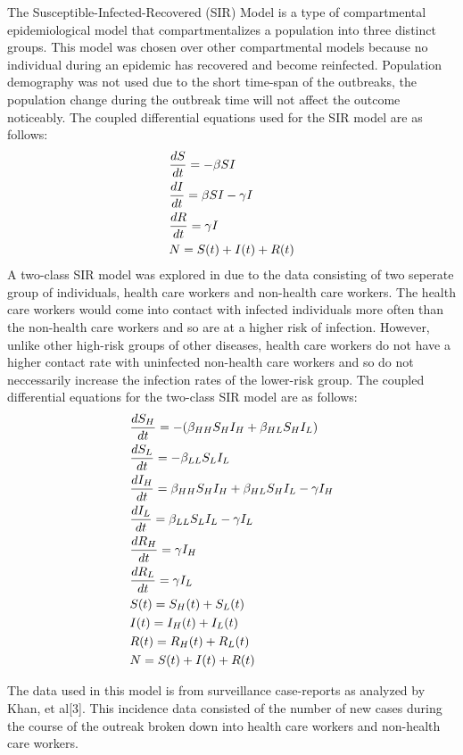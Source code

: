 \documentclass[twoside]{article}
\begin{document}
\begin{multicols}{2}
	The Susceptible-Infected-Recovered (SIR) Model is a type of compartmental epidemiological model
	that compartmentalizes a population into three distinct groups. This model was chosen over other
	compartmental models because no individual during an epidemic has recovered and become reinfected.
	Population demography was not used due to the short time-span of the outbreaks, the population
	change during the outbreak time will not affect the outcome noticeably. The coupled differential equations
	used for the SIR model are as follows:\\
		\begin{align*}
			& {dS \over dt} = -\beta S I	\\
			& {dI \over dt }= \beta S I - \gamma I	\\
			& {dR \over dt} = \gamma I\\
			& N = S(t) + I(t) +  R(t)
		\end{align*}
	A two-class SIR	model was explored in due to the data consisting of two seperate group of individuals,
	health care workers and non-health care workers. The health care workers would come into contact with
	infected individuals more often than the non-health care workers and so are at a higher risk of
	infection. However, unlike other high-risk groups of other diseases, health care workers do not
	have a higher contact rate with uninfected non-health care workers and so do not neccessarily
	increase the infection rates of the lower-risk group. The coupled differential equations for the
	two-class SIR model are as follows:\\
		\begin{align*}
			& {dS_H \over dt} = -(\beta_{HH} S_H I_H + \beta_{HL} S_H I_L)	\\
			& {dS_L \over dt} = - \beta_{LL} S_L I_L \\
			& {dI_H \over dt} = \beta_{HH} S_H I_H + \beta_{HL} S_H I_L - \gamma I_H	\\
			& {dI_L \over dt} = \beta_{LL} S_L I_L - \gamma I_L \\
			& {dR_H \over dt} = \gamma I_H	\\
			& {dR_L \over dt} = \gamma I_L	\\
			& S(t) =  S_H(t) + S_L(t) \\
			& I(t) =  I_H(t) + I_L(t) \\
			&R(t) =  R_H(t) + R_L(t) \\
			&  N = S(t) + I(t) +  R(t)
		\end{align*}

	The data used in this model is from surveillance case-reports as analyzed by Khan, et al[3].
	This incidence data consisted of the number of new cases during the course of the outreak
	broken down into health care workers and non-health care workers. \\ 


\end{multicols}
\end{document}
